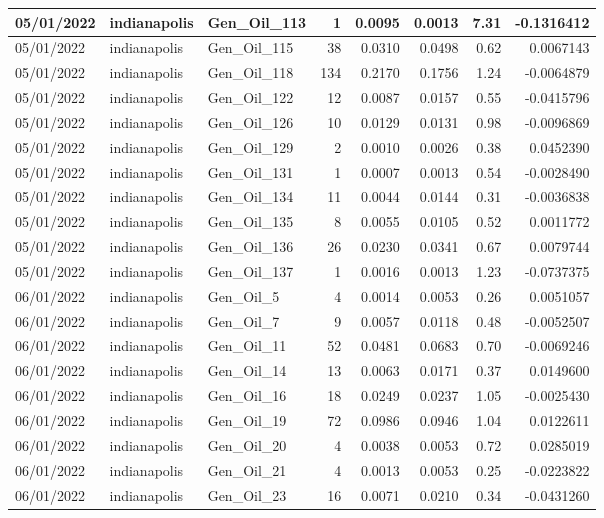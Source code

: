 \documentclass[
  letterpaper,
  DIV=11,
  numbers=noendperiod]{scrartcl}
\begin{document}
\begin{tabular}{l|l|l|r|r|r|r|r}
\hline
05/01/2022 & indianapolis & Gen\_Oil\_113 & 1 & 0.0095 & 0.0013 & 7.31 & -0.1316412\\
\hline
05/01/2022 & indianapolis & Gen\_Oil\_115 & 38 & 0.0310 & 0.0498 & 0.62 & 0.0067143\\
\hline
05/01/2022 & indianapolis & Gen\_Oil\_118 & 134 & 0.2170 & 0.1756 & 1.24 & -0.0064879\\
\hline
05/01/2022 & indianapolis & Gen\_Oil\_122 & 12 & 0.0087 & 0.0157 & 0.55 & -0.0415796\\
\hline
05/01/2022 & indianapolis & Gen\_Oil\_126 & 10 & 0.0129 & 0.0131 & 0.98 & -0.0096869\\
\hline
05/01/2022 & indianapolis & Gen\_Oil\_129 & 2 & 0.0010 & 0.0026 & 0.38 & 0.0452390\\
\hline
05/01/2022 & indianapolis & Gen\_Oil\_131 & 1 & 0.0007 & 0.0013 & 0.54 & -0.0028490\\
\hline
05/01/2022 & indianapolis & Gen\_Oil\_134 & 11 & 0.0044 & 0.0144 & 0.31 & -0.0036838\\
\hline
05/01/2022 & indianapolis & Gen\_Oil\_135 & 8 & 0.0055 & 0.0105 & 0.52 & 0.0011772\\
\hline
05/01/2022 & indianapolis & Gen\_Oil\_136 & 26 & 0.0230 & 0.0341 & 0.67 & 0.0079744\\
\hline
05/01/2022 & indianapolis & Gen\_Oil\_137 & 1 & 0.0016 & 0.0013 & 1.23 & -0.0737375\\
\hline
06/01/2022 & indianapolis & Gen\_Oil\_5 & 4 & 0.0014 & 0.0053 & 0.26 & 0.0051057\\
\hline
06/01/2022 & indianapolis & Gen\_Oil\_7 & 9 & 0.0057 & 0.0118 & 0.48 & -0.0052507\\
\hline
06/01/2022 & indianapolis & Gen\_Oil\_11 & 52 & 0.0481 & 0.0683 & 0.70 & -0.0069246\\
\hline
06/01/2022 & indianapolis & Gen\_Oil\_14 & 13 & 0.0063 & 0.0171 & 0.37 & 0.0149600\\
\hline
06/01/2022 & indianapolis & Gen\_Oil\_16 & 18 & 0.0249 & 0.0237 & 1.05 & -0.0025430\\
\hline
06/01/2022 & indianapolis & Gen\_Oil\_19 & 72 & 0.0986 & 0.0946 & 1.04 & 0.0122611\\
\hline
06/01/2022 & indianapolis & Gen\_Oil\_20 & 4 & 0.0038 & 0.0053 & 0.72 & 0.0285019\\
\hline
06/01/2022 & indianapolis & Gen\_Oil\_21 & 4 & 0.0013 & 0.0053 & 0.25 & -0.0223822\\
\hline
06/01/2022 & indianapolis & Gen\_Oil\_23 & 16 & 0.0071 & 0.0210 & 0.34 & -0.0431260\\

\end{tabular}
\end{document}

